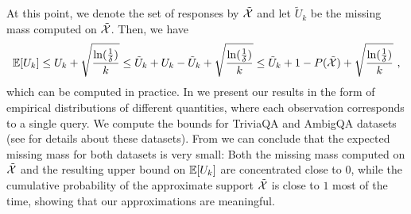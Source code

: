 At this point, we denote the set of responses by $\tilde {{\mathcal{X}}}$ and let $\tilde U_k$ be the missing mass computed on $\tilde {{\mathcal{X}}}$.
Then, we have
\begin{align*}
  \mathbb{E}[U_k] \leq U_k + \sqrt{\frac{\ln(\frac{1}{\delta})}{k}}
  \leq \tilde U_k + U_k - \tilde U_k + \sqrt{\frac{\ln(\frac{1}{\delta})}{k}}
  \leq \tilde U_k + 1 - P(\tilde{{\mathcal{X}}}) + \sqrt{\frac{\ln(\frac{1}{\delta})}{k}}~,
\end{align*}
which can be computed in practice.
%
In  we present our results in the form of empirical distributions of different quantities, where each observation corresponds to a single query.
%
%
We compute the bounds for TriviaQA and AmbigQA datasets (see  for details about these datasets).
%
From  we can conclude that the expected missing mass for both datasets is very small: Both the missing mass computed on $\tilde{{\mathcal{X}}}$ and the resulting upper bound on $\mathbb{E}[U_k]$ 
are concentrated close to $0$, while the cumulative probability of the approximate support $\tilde{{\mathcal{X}}}$ is close to $1$ most of the time, showing that our approximations are meaningful.
